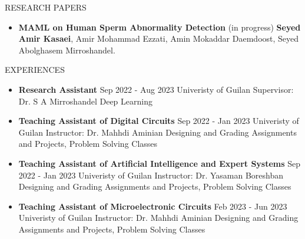\documentclass[]{CV}
\begin{document}
\begin{section}{RESEARCH PAPERS}
\begin{itemize}
\item \textbf{MAML on Human Sperm Abnormality Detection} \hfill (in progress)\newline
\textbf{Seyed Amir Kasaei}, Amir Mohammad  Ezzati, Amin Mokaddar Daemdoost, Seyed Abolghasem Mirroshandel.
\end{itemize}
\end{section}


\begin{section}{EXPERIENCES}
\begin{multicols}{2}
\begin{itemize}
\item {\textbf{Research Assistant} \newline Sep 2022 - Aug 2023 \newline Univeristy of Guilan \newline Supervisor: Dr. S A Mirroshandel \newline Deep Learning}
\item {\textbf{Teaching Assistant of Digital Circuits} \newline Sep 2022 - Jan 2023 \newline Univeristy of Guilan  \newline Instructor: Dr. Mahhdi Aminian \newline Designing and Grading Assignments and Projects, Problem Solving Classes}\\

\item {\textbf{Teaching Assistant of Artificial Intelligence and Expert Systems} \newline Sep 2022 - Jan 2023 \newline Univeristy of Guilan \newline Instructor: Dr. Yasaman Boreshban \newline Designing and Grading Assignments and Projects, Problem Solving Classes}

\item {\textbf{Teaching Assistant of Microelectronic Circuits} \newline Feb 2023 - Jun 2023 \newline Univeristy of Guilan \newline Instructor: Dr. Mahhdi Aminian \newline Designing and Grading Assignments and Projects, Problem Solving Classes}
\end{itemize}
\end{multicols}
\end{section}
\end{document}
